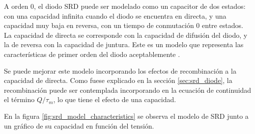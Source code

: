 A orden 0, el diodo SRD puede ser modelado como un capacitor de dos estados: con
una capacidad infinita cuando el diodo se encuentra en directa, y una capacidad
muy baja en reversa, con un tiempo de conmutación 0 entre estados. La capacidad
de directa se corresponde con la capacidad de difusión del diodo, y la de
reversa con la capacidad de juntura. Este es un modelo que representa las
características de primer orden del diodo aceptablemente \cite{moll1969}.

Se puede mejorar este modelo incorporando los efectos de recombinación a la
capacidad de directa. Como fuese explicado en la sección \ref{sec:srd_diode}, la
recombinación puede ser contemplada incorporando en la ecuación de continuidad
el término $Q/\tau_m$, lo que tiene el efecto de una capacidad.

En la figura \ref{fig:srd_model_characteristics} se observa el modelo de SRD
junto a un gráfico de su capacidad en función del tensión.

